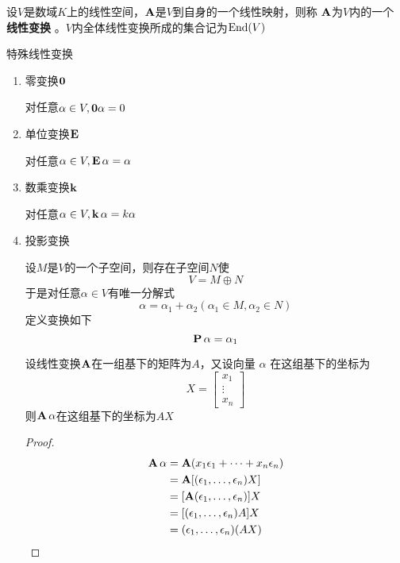\documentclass[11pt]{article}
\begin{document}
\begin{definition}[]
设\(V\)是数域\(K\)上的线性空间，\(\operatorname{\textbf{A}}\)是\(V\)到自身的一个线性映射，则称
\(\operatorname{\textbf{A}}\)为\(V\)内的一个 \textbf{线性变换} 。\(V\)内全体线性变换所成的集合记为\(\operatorname{End}(V)\)
\end{definition}

特殊线性变换
\begin{enumerate}
\item 零变换\(\mathbf{0}\)

对任意\(\alpha\in V,\mathbf{0}\alpha=0\)

\item 单位变换\(\operatorname{\textbf{E}}\)

对任意\(\alpha\in V,\operatorname{\textbf{E}}\alpha=\alpha\)

\item 数乘变换\(\operatorname{\textbf{k}}\)

对任意\(\alpha\in V,\operatorname{\textbf{k}}\alpha=k\alpha\)

\item 投影变换

设\(M\)是\(V\)的一个子空间，则存在子空间\(N\)使
\begin{equation*}
V=M\oplus N
\end{equation*}
于是对任意\(\alpha\in V\)有唯一分解式
\begin{equation*}
\alpha=\alpha_1+\alpha_2(\alpha_1\in M,\alpha_2\in N)
\end{equation*}
定义变换如下
\begin{equation*}
\operatorname{\textbf{P}}\alpha=\alpha_1
\end{equation*}

\begin{proposition}[]
设线性变换\(\operatorname{\textbf{A}}\)在一组基下的矩阵为\(A\)，又设向量 \(\alpha\) 在这组基下的坐标为
\begin{equation*}
X=
\begin{bmatrix}
x_1\\\vdots\\x_n
\end{bmatrix}
\end{equation*}
则\(\operatorname{\textbf{A}}\alpha\)在这组基下的坐标为\(AX\)
\end{proposition}

\begin{proof}
\begin{align*}
\operatorname{\textbf{A}}\alpha&=\operatorname{\textbf{A}}(x_1\epsilon_1+\dots+x_n\epsilon_n)\\
&=\operatorname{\textbf{A}}[(\epsilon_1,\dots,\epsilon_n)X]\\
&=[\operatorname{\textbf{A}}(\epsilon_1,\dots,\epsilon_n)]X\\
&=[(\epsilon_1,\dots,\epsilon_n)A]X\\
&=(\epsilon_1,\dots,\epsilon_n)(AX)
\end{align*}
\end{proof}


\end{enumerate}
\end{document}
